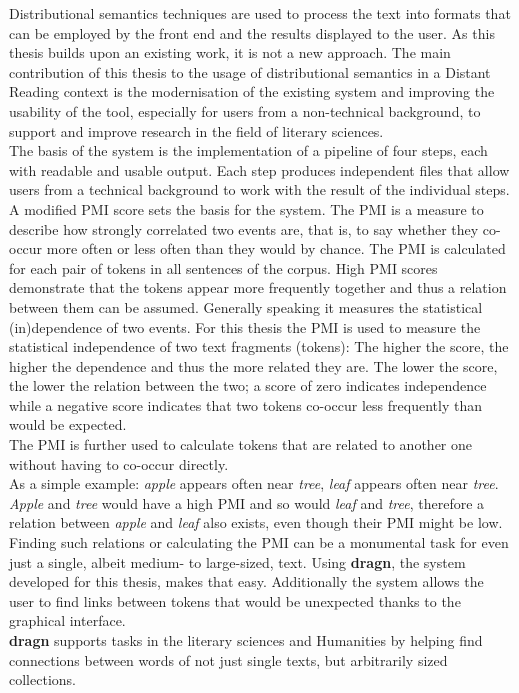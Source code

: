 Distributional semantics techniques are used to process the text into formats that can be employed by the front end and the results displayed to the user. As this thesis builds upon an existing work, it is not a new approach. The main contribution of this thesis to the usage of distributional semantics in a Distant Reading context is the modernisation of the existing system and improving the usability of the tool, especially for users from a non-technical background, to support and improve research in the field of literary sciences.\\
The basis of the system is the implementation of a pipeline of four steps, each with readable and usable output. Each step produces independent files that allow users from a technical background to work with the result of the individual steps.\\
A modified PMI score sets the basis for the system. The PMI is a measure to describe how strongly correlated two events are, that is, to say whether they co-occur more often or less often than they would by chance. The PMI is calculated for each pair of tokens in all sentences of the corpus. High PMI scores demonstrate that the tokens appear more frequently together and thus a relation between them can be assumed. Generally speaking it measures the statistical (in)dependence of two events. For this thesis the PMI is used to measure the statistical independence of two text fragments (tokens): The higher the score, the higher the dependence and thus the more related they are. The lower the score, the lower the relation between the two; a score of zero indicates independence while a negative score indicates that two tokens co-occur less frequently than would be expected.\\
The PMI is further used to calculate tokens that are related to another one without having to co-occur directly.\\
As a simple example: \textit{apple} appears often near \textit{tree}, \textit{leaf} appears often near \textit{tree}. \textit{Apple} and \textit{tree} would have a high PMI and so would \textit{leaf} and \textit{tree}, therefore a relation between \textit{apple} and \textit{leaf} also exists, even though their PMI might be low.\\
Finding such relations or calculating the PMI can be a monumental task for even just a single, albeit medium- to large-sized, text. Using \textbf{dragn}, the system developed for this thesis, makes that easy. Additionally the system allows the user to find links between tokens that would be unexpected thanks to the graphical interface.\\
\textbf{dragn} supports tasks in the literary sciences and Humanities by helping find connections between words of not just single texts, but arbitrarily sized collections.

